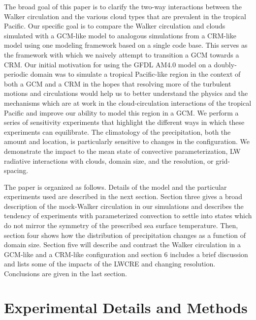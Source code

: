 \documentclass[draft]{agujournal2019}
\begin{document}
The broad goal of this paper is to clarify the two-way interactions between the Walker circulation and 
the various cloud types that are prevalent in the tropical Pacific.   Our specific goal is
to compare the Walker circulation and clouds simulated with a GCM-like model to analogous 
simulations from a CRM-like model using one modeling framework based on a single code base. 
This serves as the framework with which we naively attempt to transition a GCM 
towards a CRM.  Our initial motivation for using the 
GFDL AM4.0 model on a doubly-periodic domain was to simulate a tropical Pacific-like region 
in the context of both a GCM and a CRM in the hopes that resolving more of the turbulent motions and circulations
would help us to better understand the physics and the mechanisms which are at work in the cloud-circulation
interactions of the tropical Pacific and improve our ability to model this region in a GCM.    
We perform a series of sensitivity experiments that highlight the different ways in which these experiments can equilibrate.  
The climatology of the precipitation, both the amount and location, is particularly sensitive to changes in the configuration.   
We demonstrate the impact to the mean state of convective parameterization, LW radiative interactions with clouds, domain size, 
and the resolution, or grid-spacing.

The paper is organized as follows.  Details of the model and the particular experiments used are described
in the next section. Section three gives a broad description of the mock-Walker circulation in our simulations and
describes the tendency of experiments with parameterized convection 
to settle into states which do not mirror the symmetry of the prescribed sea surface temperature.   
Then, section four shows how the distribution of precipitation changes as a function of domain size.  
Section five will describe and contrast the Walker circulation in a GCM-like and a CRM-like configuration and
section 6 includes a brief discussion and lists some of the impacts of the LWCRE and changing 
resolution.  Conclusions are given in the last section.   

\section{Experimental Details and Methods}
\end{document}
